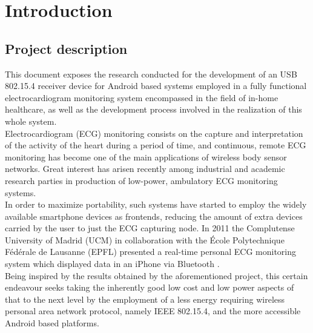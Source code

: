 \newcommand{\refer}[1]{\autoref{#1}, \emph{\nameref{#1}}}

\chapter{Introduction}
\label{cha:intro}
	\section{Project description}
	\label{sec:prj-descr}

		This document exposes the research conducted for the development of an USB 802.15.4 %
		receiver device for Android based systems employed in a fully 
		functional electrocardiogram monitoring system encompassed in the field of in-home healthcare,
		as well as the development process involved in the realization of this whole system.\\

		Electrocardiogram (ECG) monitoring consists on the capture and interpretation of the activity of the heart during a period of time, and continuous, remote ECG monitoring has become one of the main applications of wireless body sensor networks. Great interest has arisen recently among industrial and academic research parties in production of low-power, ambulatory ECG monitoring systems.\\

		In order to maximize portability, such systems have started to employ the widely available smartphone devices as frontends, reducing the amount of extra devices carried by the user to just the ECG capturing node. In 2011 the Complutense University of Madrid (UCM) in collaboration with the École Polytechnique Fédérale de Lausanne (EPFL) presented a real-time personal ECG monitoring system which displayed data in an iPhone via Bluetooth \cite{ESL}.\\

		Being inspired by the results obtained by the aforementioned project, this certain  endeavour seeks taking the inherently good low cost and low power aspects of that to the next level by the employment of a less energy requiring wireless personal area network protocol, namely IEEE 802.15.4, and the more accessible Android based platforms.\\


